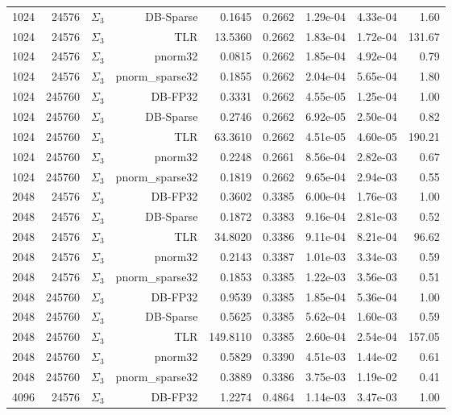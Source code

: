 \begin{tabular}{|r|r|r|r|r|r|r|r|r|}
  1024 & 24576 & $\Sigma_3$ & DB-Sparse & 0.1645 & 0.2662 & 1.29e-04 & 4.33e-04 & 1.60 \\
  1024 & 24576 & $\Sigma_3$ & TLR & 13.5360 & 0.2662 & 1.83e-04 & 1.72e-04 & 131.67 \\
  1024 & 24576 & $\Sigma_3$ & pnorm32 & 0.0815 & 0.2662 & 1.85e-04 & 4.92e-04 & 0.79 \\
  1024 & 24576 & $\Sigma_3$ & pnorm\_sparse32 & 0.1855 & 0.2662 & 2.04e-04 & 5.65e-04 & 1.80 \\
  1024 & 245760 & $\Sigma_3$ & DB-FP32 & 0.3331 & 0.2662 & 4.55e-05 & 1.25e-04 & 1.00 \\
  1024 & 245760 & $\Sigma_3$ & DB-Sparse & 0.2746 & 0.2662 & 6.92e-05 & 2.50e-04 & 0.82 \\
  1024 & 245760 & $\Sigma_3$ & TLR & 63.3610 & 0.2662 & 4.51e-05 & 4.60e-05 & 190.21 \\
  1024 & 245760 & $\Sigma_3$ & pnorm32 & 0.2248 & 0.2661 & 8.56e-04 & 2.82e-03 & 0.67 \\
  1024 & 245760 & $\Sigma_3$ & pnorm\_sparse32 & 0.1819 & 0.2662 & 9.65e-04 & 2.94e-03 & 0.55 \\
  2048 & 24576 & $\Sigma_3$ & DB-FP32 & 0.3602 & 0.3385 & 6.00e-04 & 1.76e-03 & 1.00 \\
  2048 & 24576 & $\Sigma_3$ & DB-Sparse & 0.1872 & 0.3383 & 9.16e-04 & 2.81e-03 & 0.52 \\
  2048 & 24576 & $\Sigma_3$ & TLR & 34.8020 & 0.3386 & 9.11e-04 & 8.21e-04 & 96.62 \\
  2048 & 24576 & $\Sigma_3$ & pnorm32 & 0.2143 & 0.3387 & 1.01e-03 & 3.34e-03 & 0.59 \\
  2048 & 24576 & $\Sigma_3$ & pnorm\_sparse32 & 0.1853 & 0.3385 & 1.22e-03 & 3.56e-03 & 0.51 \\
  2048 & 245760 & $\Sigma_3$ & DB-FP32 & 0.9539 & 0.3385 & 1.85e-04 & 5.36e-04 & 1.00 \\
  2048 & 245760 & $\Sigma_3$ & DB-Sparse & 0.5625 & 0.3385 & 5.62e-04 & 1.60e-03 & 0.59 \\
  2048 & 245760 & $\Sigma_3$ & TLR & 149.8110 & 0.3385 & 2.60e-04 & 2.54e-04 & 157.05 \\
  2048 & 245760 & $\Sigma_3$ & pnorm32 & 0.5829 & 0.3390 & 4.51e-03 & 1.44e-02 & 0.61 \\
  2048 & 245760 & $\Sigma_3$ & pnorm\_sparse32 & 0.3889 & 0.3386 & 3.75e-03 & 1.19e-02 & 0.41 \\
  4096 & 24576 & $\Sigma_3$ & DB-FP32 & 1.2274 & 0.4864 & 1.14e-03 & 3.47e-03 & 1.00 \\

\end{tabular}

